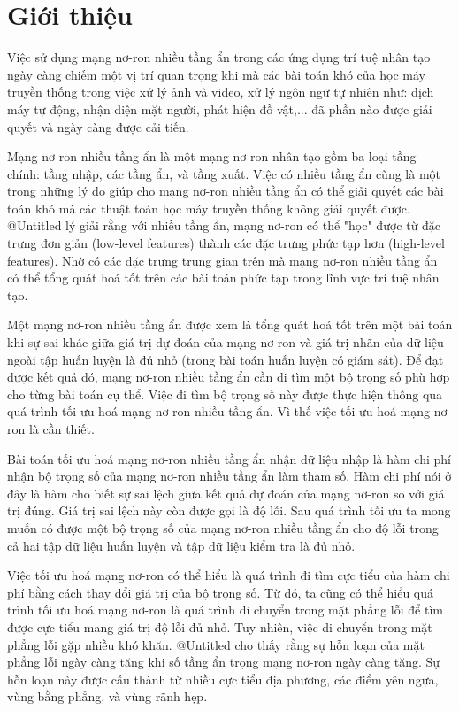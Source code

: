 \chapter{Giới thiệu}
\label{Chapter1}

Việc sử dụng mạng nơ-ron nhiều tầng ẩn trong các ứng dụng trí tuệ nhân tạo ngày càng chiếm một vị trí quan trọng khi mà các bài toán khó của học máy truyền thống trong việc xử lý ảnh và video, xử lý ngôn ngữ tự nhiên như: dịch máy tự động, nhận diện mặt người, phát hiện đồ vật,... đã phần nào được giải quyết và ngày càng được cải tiến.

Mạng nơ-ron nhiều tầng ẩn là một mạng nơ-ron nhân tạo gồm ba loại tầng chính: tầng nhập, các tầng ẩn, và tầng xuất. Việc có nhiều tầng ẩn cũng là một trong những lý do giúp cho mạng nơ-ron nhiều tầng ẩn có thể giải quyết các bài toán khó mà các thuật toán học máy truyền thống không giải quyết được. @Untitled lý giải rằng với nhiều tầng ẩn, mạng nơ-ron có thể "học" được từ đặc trưng đơn giản (low-level features) thành các đặc trưng phức tạp hơn (high-level features). Nhờ có các đặc trưng trung gian trên mà mạng nơ-ron nhiều tầng ẩn có thể tổng quát hoá tốt trên các bài toán phức tạp trong lĩnh vực trí tuệ nhân tạo.

Một mạng nơ-ron nhiều tầng ẩn được xem là tổng quát hoá tốt trên một bài toán khi sự sai khác giữa giá trị dự đoán của mạng nơ-ron và giá trị nhãn của dữ liệu ngoài tập huấn luyện là đủ nhỏ (trong bài toán huấn luyện có giám sát). Để đạt được kết quả đó, mạng nơ-ron nhiều tầng ẩn cần đi tìm một bộ trọng số phù hợp cho từng bài toán cụ thể. Việc đi tìm bộ trọng số này được thực hiện thông qua quá trình tối ưu hoá mạng nơ-ron nhiều tầng ẩn. Vì thế việc tối ưu hoá mạng nơ-ron là cần thiết.

Bài toán tối ưu hoá mạng nơ-ron nhiều tầng ẩn nhận dữ liệu nhập là hàm chi phí nhận bộ trọng số của mạng nơ-ron nhiều tầng ẩn làm tham số. Hàm chi phí nói ở đây là hàm cho biết sự sai lệch giữa kết quả dự đoán của mạng nơ-ron so với giá trị đúng. Giá trị sai lệch này còn được gọi là độ lỗi. Sau quá trình tối ưu ta mong muốn có được một bộ trọng số của mạng nơ-ron nhiều tầng ẩn cho độ lỗi trong cả hai tập dữ liệu huấn luyện và tập dữ liệu kiểm tra là đủ nhỏ.

Việc tối ưu hoá mạng nơ-ron có thể hiểu là quá trình đi tìm cực tiểu  của hàm chi phí bằng cách thay đổi giá trị của bộ trọng số. Từ đó, ta cũng có thể hiểu quá trình tối ưu hoá mạng nơ-ron là quá trình di chuyển trong mặt phẳng lỗi để tìm được cực tiểu mang giá trị độ lỗi đủ nhỏ. Tuy nhiên, việc di chuyển trong mặt phẳng lỗi gặp nhiều khó khăn. @Untitled cho thấy rằng sự hỗn loạn của mặt phẳng lỗi ngày càng tăng khi số tầng ẩn trọng mạng nơ-ron ngày càng tăng. Sự hỗn loạn này được cấu thành từ nhiều cực tiểu địa phương, các điểm yên ngựa, vùng bằng phẳng, và vùng rãnh hẹp.

